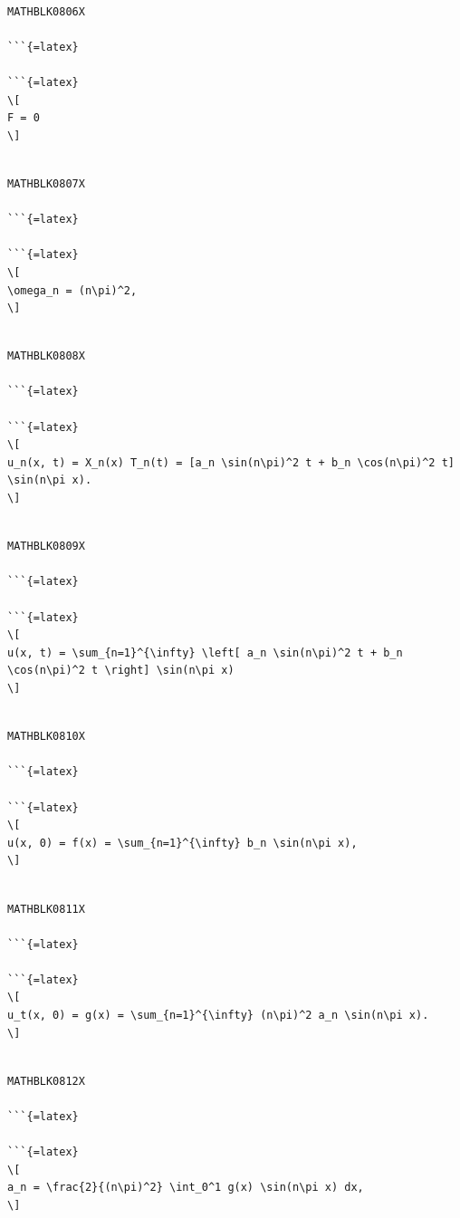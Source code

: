 \documentclass[
]{article}
\begin{document}
\begin{verbatim}

MATHBLK0806X

```{=latex}

```{=latex}
\[
F = 0
\]
\end{verbatim}

\begin{verbatim}

MATHBLK0807X

```{=latex}

```{=latex}
\[
\omega_n = (n\pi)^2,
\]
\end{verbatim}

\begin{verbatim}

MATHBLK0808X

```{=latex}

```{=latex}
\[
u_n(x, t) = X_n(x) T_n(t) = [a_n \sin(n\pi)^2 t + b_n \cos(n\pi)^2 t] \sin(n\pi x).
\]
\end{verbatim}

\begin{verbatim}

MATHBLK0809X

```{=latex}

```{=latex}
\[
u(x, t) = \sum_{n=1}^{\infty} \left[ a_n \sin(n\pi)^2 t + b_n \cos(n\pi)^2 t \right] \sin(n\pi x)
\]
\end{verbatim}

\begin{verbatim}

MATHBLK0810X

```{=latex}

```{=latex}
\[
u(x, 0) = f(x) = \sum_{n=1}^{\infty} b_n \sin(n\pi x),
\]
\end{verbatim}

\begin{verbatim}

MATHBLK0811X

```{=latex}

```{=latex}
\[
u_t(x, 0) = g(x) = \sum_{n=1}^{\infty} (n\pi)^2 a_n \sin(n\pi x).
\]
\end{verbatim}

\begin{verbatim}

MATHBLK0812X

```{=latex}

```{=latex}
\[
a_n = \frac{2}{(n\pi)^2} \int_0^1 g(x) \sin(n\pi x) dx,
\]
\end{verbatim}
\end{document}
